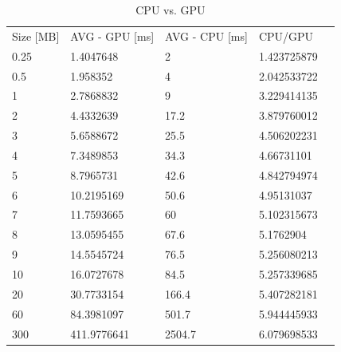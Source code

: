 \documentclass[conference]{IEEEtran}
\begin{document}
\begin{table}[h!]
\centering
\caption{CPU vs. GPU}
\label{table}
\begin{tabular}{lllll}
Size {[}MB{]} & AVG - GPU {[}ms{]} & AVG - CPU {[}ms{]} & CPU/GPU     &  \\
0.25          & 1.4047648          & 2                  & 1.423725879 &  \\
0.5           & 1.958352           & 4                  & 2.042533722 &  \\
1             & 2.7868832          & 9                  & 3.229414135 &  \\
2             & 4.4332639          & 17.2               & 3.879760012 &  \\
3             & 5.6588672          & 25.5               & 4.506202231 &  \\
4             & 7.3489853          & 34.3               & 4.66731101  &  \\
5             & 8.7965731          & 42.6               & 4.842794974 &  \\
6             & 10.2195169         & 50.6               & 4.95131037  &  \\
7             & 11.7593665         & 60                 & 5.102315673 &  \\
8             & 13.0595455         & 67.6               & 5.1762904   &  \\
9             & 14.5545724         & 76.5               & 5.256080213 &  \\
10            & 16.0727678         & 84.5               & 5.257339685 &  \\
20            & 30.7733154         & 166.4              & 5.407282181 &  \\
60            & 84.3981097         & 501.7              & 5.944445933 &  \\
300           & 411.9776641        & 2504.7             & 6.079698533 & 
\end{tabular}
\end{table}







\ifCLASSOPTIONcaptionsoff
  \newpage
\fi
\end{document}
